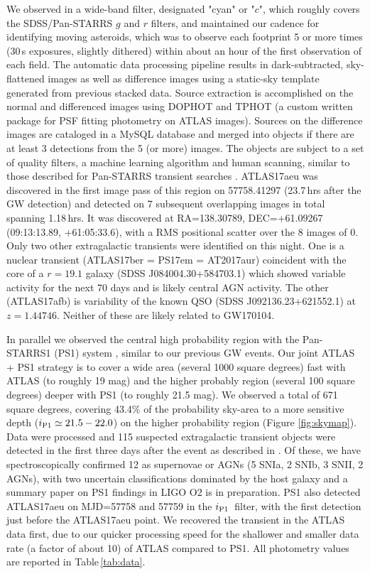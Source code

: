 \documentclass[twocolumn]{aastex61}
\newcommand{\ips}{\ensuremath{i_{\rm P1}}}
\begin{document}
We observed in
a wide-band filter, designated "cyan" or "$c$", which roughly covers the SDSS/Pan-STARRS $g$ and $r$ filters, and maintained our cadence for identifying moving asteroids, which was to observe each footprint 5 or more times (30\,s exposures, slightly dithered) within about an hour of the first observation of each field. The automatic data processing pipeline results in dark-subtracted, sky-flattened images as well as difference images using a static-sky template generated from previous stacked data.  Source extraction is accomplished on the normal and differenced images using DOPHOT \citep{1993PASP..105.1342S} and TPHOT  (a custom written package
for PSF fitting photometry on ATLAS images).  Sources on the difference images are cataloged in a MySQL database and
merged into objects if there are at least 3 detections from the 5 (or more) images. The objects are subject to a set of quality filters, 
a machine learning algorithm and human scanning, similar to those described for Pan-STARRS transient searches 
\citep{2015MNRAS.449..451W,2016MNRAS.462.4094S}.  ATLAS17aeu was discovered in the first image  pass of this region on 57758.41297 (23.7\,hrs after the GW detection) and detected on 7 subsequent overlapping images in total spanning 1.18\,hrs.  It was discovered at  RA=138.30789, DEC=+61.09267 
(09:13:13.89, +61:05:33.6), with a RMS  positional scatter over the 8 images of 0. 
Only two other extragalactic transients were identified  on this night.
One is a nuclear transient (ATLAS17ber = PS17em = AT2017aur) coincident with 
the core of a $r=19.1$ galaxy (SDSS J084004.30+584703.1) which showed variable 
activity for the next 70 days and is likely central AGN activity. The other (ATLAS17afb)
is variability of the known QSO (SDSS J092136.23+621552.1) at $z=1.44746$. Neither
of these are likely related to GW170104. 

In parallel we observed the central high probability region with the Pan-STARRS1 (PS1) system \citep{2016arXiv161205560C}, 
similar to our previous GW events. Our joint ATLAS + PS1 strategy is to cover a wide area (several 1000
square degrees) fast with ATLAS (to roughly 19 mag) and the higher probably region (several 100 square degrees) deeper with PS1 (to roughly 21.5 mag). 
We observed a total of 671 square degrees, covering 
43.4\% of the probability sky-area to a more sensitive depth ($\ips \simeq 21.5-22.0$) on the higher probability region
(Figure \ref{fig:skymap}). 
Data were processed and 115 suspected extragalactic transient objects were detected in the first three days after the event as described in \cite{2016MNRAS.462.4094S}.
Of these, we have  spectroscopically confirmed 12 as supernovae or AGNs (5 SNIa, 2 SNIb, 3 SNII, 2 AGNs), with two uncertain classifications dominated by the host galaxy
and a summary paper on PS1 findings in LIGO O2 is
in preparation. 
PS1 also detected ATLAS17aeu on MJD=57758 and 57759
in the \ips\ filter, with the first 
detection just before the ATLAS17aeu point.  We recovered the transient in the ATLAS data first, 
due to our quicker processing speed for the shallower and smaller data rate (a factor of about 10) of ATLAS
compared to PS1.  All photometry values are reported in Table\,\ref{tab:data}. 
\end{document}
